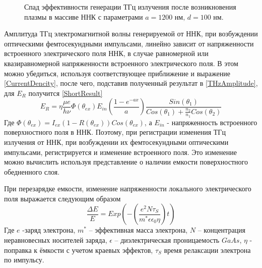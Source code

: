 \documentclass[a4paper,14pt,russian]{extreport}
\begin{document}
				\begin{figure}[H]
					\caption{Спад эффективности генерации ТГц излучения после возникновения плазмы в массиве ННК с параметрами $a = 1200 \text{ нм, } d = 100 \text{ нм}$.}
				\label{ris:short1200100}
				\end{figure}
				Амплитуда ТГц электромагнитной волны генерируемой от ННК, при возбуждении оптическими фемтосекундными импульсами, линейно зависит от напряженности встроенного электрического поля ННК, в случае равномерной или квазиравномерной напряженности встроенного электрического поля. В этом можно убедиться, используя соответствующее приближение и выражение \ref{CurrentDencity}, после чего, подставив полученный результат в \ref{THzAmplitude}, для $E_R$ получится \ref{ShortResult}
				\begin{equation}\label{ShortResult}
					E_R = \eta \frac{\mu e}{h \nu}\Phi(\theta_{ex}) E_{in} \left( \frac{1-e^{-a x}}{a} \right) \frac{Sin(\theta_1)}{Cos(\theta_1)+\frac{n_2}{n_1}Cos(\theta_2)}
				\end{equation}
				Где $\Phi(\theta_{ex}) = I_{ex}(1-R(\theta_{ex}))Cos(\theta_{ex})$, а $E_{in}$ - напряженность встроенного поверхностного поля в ННК. Поэтому, при регистрации изменения ТГц излучения от ННК, при возбуждении их фемтосекундными оптическими импульсами, регистрируется и изменение встроенного поля. Это изменение можно вычислить используя представление о наличии емкости поверхностного обедненного слоя.\par
				При перезарядке емкости, изменение напряженности локального электрического поля выражается следующим образом 
				\begin{equation}\label{Effectivity}
					\frac{\Delta E}{E} = Exp\left(-\left(\frac{e^2N\tau_S}{m^*\epsilon \epsilon_0 \eta}\right)t\right)
				\end{equation}
				Где $e$ -заряд электрона, $m^*$ – эффективная масса электрона, $N$ – концентрация неравновесных носителей заряда, $\epsilon$ – диэлектрическая проницаемость $GaAs$, $\eta$ - поправка к ёмкости с учетом краевых эффектов, $\tau_S$ время релаксации электрона по импульсу.\par
\end{document}
